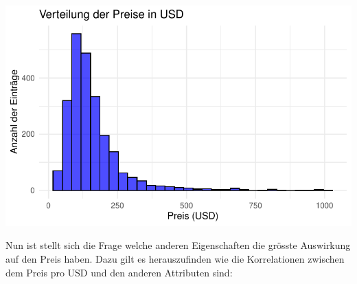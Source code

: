 \documentclass[
  journal,
]{IEEEtran}%
\begin{document}
\includegraphics{main_files/figure-pdf/unnamed-chunk-5-2.pdf}

Nun ist stellt sich die Frage welche anderen Eigenschaften die grösste
Auswirkung auf den Preis haben. Dazu gilt es herauszufinden wie die
Korrelationen zwischen dem Preis pro USD und den anderen Attributen
sind:
\end{document}

